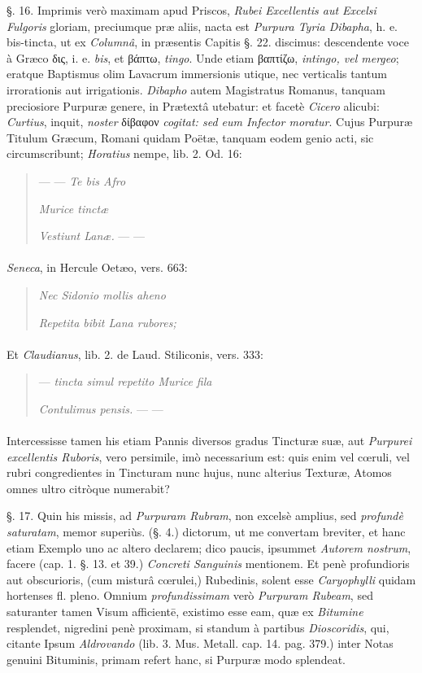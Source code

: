 \documentclass[a4paper, 11pt, oneside, polutonikogreek, german]{article}
\begin{document}
§. 16. Imprimis verò maximam apud Priscos, \emph{Rubei Excellentis aut Excelsi Fulgoris} gloriam, preciumque præ aliis, nacta est \emph{Purpura Tyria Dibapha}, h. e. bis-tincta, ut ex \emph{Columnâ}, in præsentis Capitis §. 22. discimus: descendente voce à Græco δις, i. e. \emph{bis}, et βάπτω, \emph{tingo}. Unde etiam βαπτίζω, \emph{intingo, vel mergeo}; eratque Baptismus olim Lavacrum immersionis utique, nec verticalis tantum irrorationis aut irrigationis. \emph{Dibapho} autem Magistratus Romanus, tanquam preciosiore Purpuræ genere, in Prætextâ utebatur: et facetè \emph{Cicero} alicubi: \emph{Curtius}, inquit, \emph{noster} δίβαφον \emph{cogitat: sed eum Infector moratur}. Cujus Purpuræ Titulum Græcum, Romani quidam Poëtæ, tanquam eodem genio acti, sic circumscribunt; \emph{Horatius} nempe, lib. 2. Od. 16:
\begin{quotation}
--- --- \emph{Te bis Afro}

\emph{Murice tinctæ}

\emph{Vestiunt Lanæ.} --- ---
\end{quotation}
\paragraph{}
\emph{Seneca}, in Hercule Oetæo, vers. 663:
\begin{quotation}
\emph{Nec Sidonio mollis aheno}

\emph{Repetita bibit Lana rubores;}
\end{quotation}
\paragraph{}
Et \emph{Claudianus}, lib. 2. de Laud. Stiliconis, vers. 333:
\begin{quotation}
--- \emph{tincta simul repetito Murice fila}

\emph{Contulimus pensis.} --- ---
\end{quotation}
\paragraph{}
Intercessisse tamen his etiam Pannis diversos gradus Tincturæ suæ, aut \emph{Purpurei excellentis Ruboris}, vero persimile, imò necessarium est: quis enim vel cœruli, vel rubri congredientes in Tincturam nunc hujus, nunc alterius Texturæ, Atomos omnes ultro citròque numerabit?

§. 17. Quin his missis, ad \emph{Purpuram Rubram}, non excelsè amplius, sed \emph{profundè saturatam}, memor superiùs. (§. 4.) dictorum, ut me convertam breviter, et hanc etiam Exemplo uno ac altero declarem; dico paucis, ipsummet \emph{Autorem nostrum}, facere (cap. 1. §. 13. et 39.) \emph{Concreti Sanguinis} mentionem. Et penè profundioris aut obscurioris, (cum misturâ cœrulei,) Rubedinis, solent esse \emph{Caryophylli} quidam hortenses fl. pleno. Omnium \emph{profundissimam} verò \emph{Purpuram Rubeam}, sed saturanter tamen Visum afficientē, existimo esse eam, quæ ex \emph{Bitumine} resplendet, nigredini penè proximam, si standum à partibus \emph{Dioscoridis}, qui, citante Ipsum \emph{Aldrovando} (lib. 3. Mus. Metall. cap. 14. pag. 379.) inter Notas genuini Bituminis, primam refert hanc, si Purpuræ modo splendeat.
\end{document}
